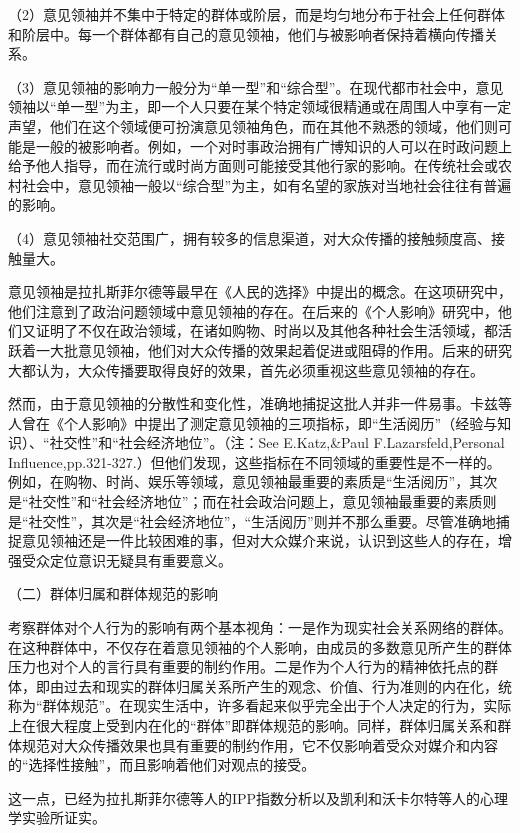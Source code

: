 \documentclass[UTF8,12pt]{ctexart}
\numberwithin{equation}{section} %
\numberwithin{figure}{section}
\numberwithin{table}{section}
\begin{document}
	（2）意见领袖并不集中于特定的群体或阶层，而是均匀地分布于社会上任何群体和阶层中。每一个群体都有自己的意见领袖，他们与被影响者保持着横向传播关系。
	
	（3）意见领袖的影响力一般分为“单一型”和“综合型”。在现代都市社会中，意见领袖以“单一型”为主，即一个人只要在某个特定领域很精通或在周围人中享有一定声望，他们在这个领域便可扮演意见领袖角色，而在其他不熟悉的领域，他们则可能是一般的被影响者。例如，一个对时事政治拥有广博知识的人可以在时政问题上给予他人指导，而在流行或时尚方面则可能接受其他行家的影响。在传统社会或农村社会中，意见领袖一般以“综合型”为主，如有名望的家族对当地社会往往有普遍的影响。
	
	（4）意见领袖社交范围广，拥有较多的信息渠道，对大众传播的接触频度高、接触量大。
	
	意见领袖是拉扎斯菲尔德等最早在《人民的选择》中提出的概念。在这项研究中，他们注意到了政治问题领域中意见领袖的存在。在后来的《个人影响》研究中，他们又证明了不仅在政治领域，在诸如购物、时尚以及其他各种社会生活领域，都活跃着一大批意见领袖，他们对大众传播的效果起着促进或阻碍的作用。后来的研究大都认为，大众传播要取得良好的效果，首先必须重视这些意见领袖的存在。
	
	然而，由于意见领袖的分散性和变化性，准确地捕捉这批人并非一件易事。卡兹等人曾在《个人影响》中提出了测定意见领袖的三项指标，即“生活阅历”（经验与知识）、“社交性”和“社会经济地位”。（注：See E.Katz,\&Paul F.Lazarsfeld,Personal Influence,pp.321-327.）但他们发现，这些指标在不同领域的重要性是不一样的。例如，在购物、时尚、娱乐等领域，意见领袖最重要的素质是“生活阅历”，其次是“社交性”和“社会经济地位”；而在社会政治问题上，意见领袖最重要的素质则是“社交性”，其次是“社会经济地位”，“生活阅历”则并不那么重要。尽管准确地捕捉意见领袖还是一件比较困难的事，但对大众媒介来说，认识到这些人的存在，增强受众定位意识无疑具有重要意义。
	
	（二）群体归属和群体规范的影响
	
	考察群体对个人行为的影响有两个基本视角：一是作为现实社会关系网络的群体。在这种群体中，不仅存在着意见领袖的个人影响，由成员的多数意见所产生的群体压力也对个人的言行具有重要的制约作用。二是作为个人行为的精神依托点的群体，即由过去和现实的群体归属关系所产生的观念、价值、行为准则的内在化，统称为“群体规范”。在现实生活中，许多看起来似乎完全出于个人决定的行为，实际上在很大程度上受到内在化的“群体”即群体规范的影响。同样，群体归属关系和群体规范对大众传播效果也具有重要的制约作用，它不仅影响着受众对媒介和内容的“选择性接触”，而且影响着他们对观点的接受。
	
	这一点，已经为拉扎斯菲尔德等人的IPP指数分析以及凯利和沃卡尔特等人的心理学实验所证实。
	
\end{document}
